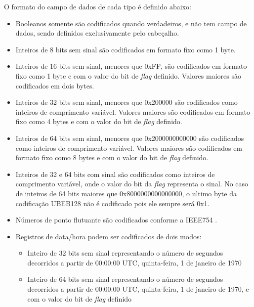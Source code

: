 O formato do campo de dados de cada tipo é definido abaixo:

\begin{itemize}

    \item Booleanos somente são codificados quando verdadeiros, e não tem campo de dados, sendo definidos exclusivamente pelo cabeçalho.

    \item Inteiros de 8 bits sem sinal são codificados em formato fixo como 1 byte.

    \item Inteiros de 16 bits sem sinal, menores que 0xFF, são codificados em formato fixo como 1 byte e com o valor do bit de \textit{flag} definido. Valores maiores são codificados em dois bytes.

    \item Inteiros de 32 bits sem sinal, menores que 0x200000 são codificados como inteiros de comprimento variável. Valores maiores são codificados em formato fixo como 4 bytes e com o valor do bit de \textit{flag} definido.

    \item Inteiros de 64 bits sem sinal, menores que 0x2000000000000 são codificados como inteiros de comprimento variável. Valores maiores são codificados em formato fixo como 8 bytes e com o valor do bit de \textit{flag} definido.

    \item Inteiros de 32 e 64 bits com sinal são codificados como inteiros de comprimento variável, onde o valor do bit da \textit{flag} representa o sinal. No caso de inteiros de 64 bits maiores que 0x8000000000000000, o ultimo byte da codificação UBEB128 não é codificado pois ele sempre será 0x1.

    \item Números de ponto flutuante são codificados conforme a IEEE754 \cite{noauthor_ieee_2019}.

    \item Registros de data/hora podem ser codificados de dois modos:
\begin{itemize}
	\item Inteiro de 32 bits sem sinal representando o número de segundos decorridos a partir de 00:00:00 UTC, quinta-feira, 1 de janeiro de 1970
    \item Inteiro de 64 bits sem sinal representando o número de segundos decorridos a partir de 00:00:00 UTC, quinta-feira, 1 de janeiro de 1970, e com o valor do bit de \textit{flag} definido
\end{itemize}


\end{itemize}
